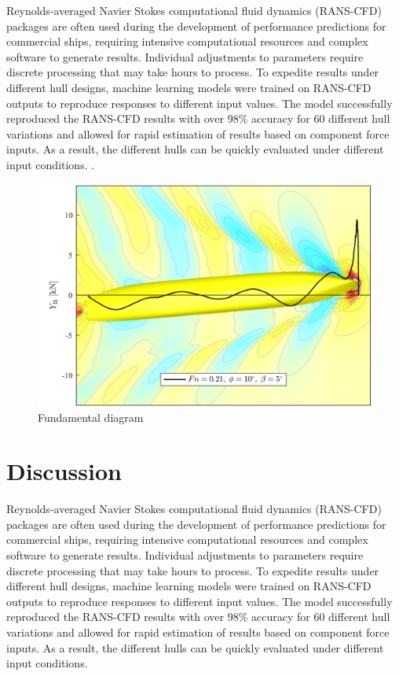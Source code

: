\documentclass[twoside,twocolumn]{article}
\begin{document}
Reynolds-averaged Navier Stokes computational fluid dynamics (RANS-CFD) packages are often used during the development of performance predictions for commercial ships, requiring intensive computational resources and complex software to generate results. Individual adjustments to parameters require discrete processing that may take hours to process. To expedite results under different hull designs, machine learning models were trained on RANS-CFD outputs to reproduce responses to different input values. The model successfully reproduced the RANS-CFD results with over 98\% accuracy for 60 different hull variations and allowed for rapid estimation of results based on component force inputs. As a result, the different hulls can be quickly evaluated under different input conditions. \citep{Freeman2018}.



\begin{figure}[]
\centering
\includegraphics[width=\columnwidth]{images/hull1.png}  %
\caption{Fundamental diagram }
\label{fig:hull2}
\end{figure}


\section{Discussion}

Reynolds-averaged Navier Stokes computational fluid dynamics (RANS-CFD) packages are often used during the development of performance predictions for commercial ships, requiring intensive computational resources and complex software to generate results. Individual adjustments to parameters require discrete processing that may take hours to process. To expedite results under different hull designs, machine learning models were trained on RANS-CFD outputs to reproduce responses to different input values. The model successfully reproduced the RANS-CFD results with over 98\% accuracy for 60 different hull variations and allowed for rapid estimation of results based on component force inputs. As a result, the different hulls can be quickly evaluated under different input conditions.
\end{document}
